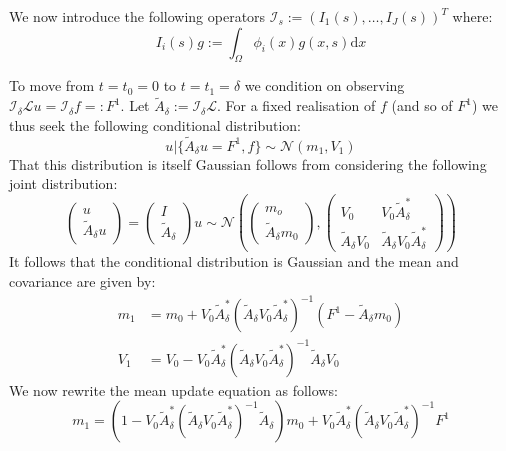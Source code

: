 \documentclass{article}
\theoremstyle{definition}
\theoremstyle{remark}
\theoremstyle{remark}
\begin{document}
\noindent We now introduce the following operators $\mathcal{I}_{s}:=(I_{1}(s),\dots,I_{J}(s))^{T}$ where:
\begin{equation}
    I_{i}(s)g:=\int_{\Omega}\phi_{i}(x)g(x,s)\mathrm{d}x
\end{equation}

To move from $t=t_{0}=0$ to $t=t_{1}=\delta$ we condition on observing $\mathcal{I}_{\delta}\mathcal{L}u=\mathcal{I}_{\delta}f=:F^{1}$. Let $\tilde{A}_{\delta}:=\mathcal{I}_{\delta}\mathcal{L}$. For a fixed realisation of $f$ (and so of $F^{1}$) we thus seek the following conditional distribution:
\begin{equation}
    u|\{\tilde{A}_{\delta}u=F^{1},f\}\sim\mathcal{N}(m_{1},V_{1})
\end{equation}
That this distribution is itself Gaussian follows from considering the following joint distribution:
\begin{equation*}
    \left(\begin{array}{c}u \\ \tilde{A}_{\delta} u\end{array}\right)=\left(\begin{array}{c}I \\ \tilde{A}_{\delta}\end{array}\right) u \sim \mathcal{N}\left(\left(\begin{array}{c}m_{o} \\ \tilde{A}_{\delta}m_{0}\end{array}\right),\left(\begin{array}{cc}V_{0} & V_{0} \tilde{A}_{\delta}^{*} \\ \tilde{A}_{\delta}V_{0} & \tilde{A}_{\delta}V_{0} \tilde{A}_{\delta}^{*}\end{array}\right)\right)
\end{equation*}
It follows that the conditional distribution is Gaussian and the mean and covariance are given by:
\begin{align}
    m_{1}&=m_{0}+V_{0}\tilde{A}_{\delta}^{*}(\tilde{A}_{\delta}V_{0}\tilde{A}_{\delta}^{*})^{-1}(F^{1}-\tilde{A}_{\delta}m_{0}) \\
    V_{1}&=V_{0}-V_{0}\tilde{A}_{\delta}^{*}(\tilde{A}_{\delta}V_{0}\tilde{A}_{\delta}^{*})^{-1}\tilde{A}_{\delta}V_{0}
\end{align}
We now rewrite the mean update equation as follows:
\begin{equation}
    \label{new_method_update}
    m_{1}=\left(1-V_{0}\tilde{A}_{\delta}^{*}(\tilde{A}_{\delta}V_{0}\tilde{A}_{\delta}^{*})^{-1}\tilde{A}_{\delta}\right)m_{0}+V_{0}\tilde{A}_{\delta}^{*}(\tilde{A}_{\delta}V_{0}\tilde{A}_{\delta}^{*})^{-1}F^{1}
\end{equation}
\end{document}
